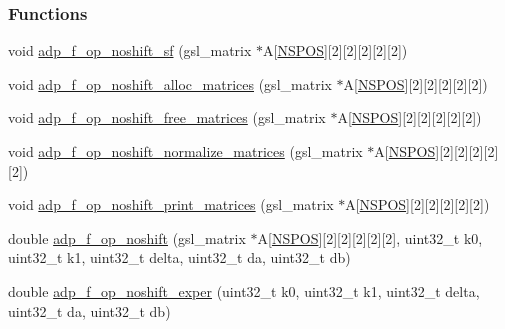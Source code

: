 \subsubsection*{\-Functions}
\begin{DoxyCompactItemize}
\item 
void \hyperlink{adp-tea-f-fk-noshift_8hh_a23de342298e8c480df8c8ba3b7125edf}{adp\-\_\-f\-\_\-op\-\_\-noshift\-\_\-sf} (gsl\-\_\-matrix $\ast$\-A\mbox{[}\hyperlink{adp-tea-f-fk-noshift_8hh_a4822a46657916694abfee9a1c1cdd137}{\-N\-S\-P\-O\-S}\mbox{]}\mbox{[}2\mbox{]}\mbox{[}2\mbox{]}\mbox{[}2\mbox{]}\mbox{[}2\mbox{]}\mbox{[}2\mbox{]})
\item 
void \hyperlink{adp-tea-f-fk-noshift_8hh_ac0b220b9e12d3deba6975d306ee0abc3}{adp\-\_\-f\-\_\-op\-\_\-noshift\-\_\-alloc\-\_\-matrices} (gsl\-\_\-matrix $\ast$\-A\mbox{[}\hyperlink{adp-tea-f-fk-noshift_8hh_a4822a46657916694abfee9a1c1cdd137}{\-N\-S\-P\-O\-S}\mbox{]}\mbox{[}2\mbox{]}\mbox{[}2\mbox{]}\mbox{[}2\mbox{]}\mbox{[}2\mbox{]}\mbox{[}2\mbox{]})
\item 
void \hyperlink{adp-tea-f-fk-noshift_8hh_a98db145f973752af2ab7143077141e54}{adp\-\_\-f\-\_\-op\-\_\-noshift\-\_\-free\-\_\-matrices} (gsl\-\_\-matrix $\ast$\-A\mbox{[}\hyperlink{adp-tea-f-fk-noshift_8hh_a4822a46657916694abfee9a1c1cdd137}{\-N\-S\-P\-O\-S}\mbox{]}\mbox{[}2\mbox{]}\mbox{[}2\mbox{]}\mbox{[}2\mbox{]}\mbox{[}2\mbox{]}\mbox{[}2\mbox{]})
\item 
void \hyperlink{adp-tea-f-fk-noshift_8hh_a60908ea41ae7cbeafb475c09623d5f0f}{adp\-\_\-f\-\_\-op\-\_\-noshift\-\_\-normalize\-\_\-matrices} (gsl\-\_\-matrix $\ast$\-A\mbox{[}\hyperlink{adp-tea-f-fk-noshift_8hh_a4822a46657916694abfee9a1c1cdd137}{\-N\-S\-P\-O\-S}\mbox{]}\mbox{[}2\mbox{]}\mbox{[}2\mbox{]}\mbox{[}2\mbox{]}\mbox{[}2\mbox{]}\mbox{[}2\mbox{]})
\item 
void \hyperlink{adp-tea-f-fk-noshift_8hh_ad426ae37e100f13ab3fe95d7f6254ba0}{adp\-\_\-f\-\_\-op\-\_\-noshift\-\_\-print\-\_\-matrices} (gsl\-\_\-matrix $\ast$\-A\mbox{[}\hyperlink{adp-tea-f-fk-noshift_8hh_a4822a46657916694abfee9a1c1cdd137}{\-N\-S\-P\-O\-S}\mbox{]}\mbox{[}2\mbox{]}\mbox{[}2\mbox{]}\mbox{[}2\mbox{]}\mbox{[}2\mbox{]}\mbox{[}2\mbox{]})
\item 
double \hyperlink{adp-tea-f-fk-noshift_8hh_adae0e9b5832d3b61a0c626b547441349}{adp\-\_\-f\-\_\-op\-\_\-noshift} (gsl\-\_\-matrix $\ast$\-A\mbox{[}\hyperlink{adp-tea-f-fk-noshift_8hh_a4822a46657916694abfee9a1c1cdd137}{\-N\-S\-P\-O\-S}\mbox{]}\mbox{[}2\mbox{]}\mbox{[}2\mbox{]}\mbox{[}2\mbox{]}\mbox{[}2\mbox{]}\mbox{[}2\mbox{]}, uint32\-\_\-t k0, uint32\-\_\-t k1, uint32\-\_\-t delta, uint32\-\_\-t da, uint32\-\_\-t db)
\item 
double \hyperlink{adp-tea-f-fk-noshift_8hh_a1eda076dbcc18021d891ac9f0532d50f}{adp\-\_\-f\-\_\-op\-\_\-noshift\-\_\-exper} (uint32\-\_\-t k0, uint32\-\_\-t k1, uint32\-\_\-t delta, uint32\-\_\-t da, uint32\-\_\-t db)
\end{DoxyCompactItemize}


